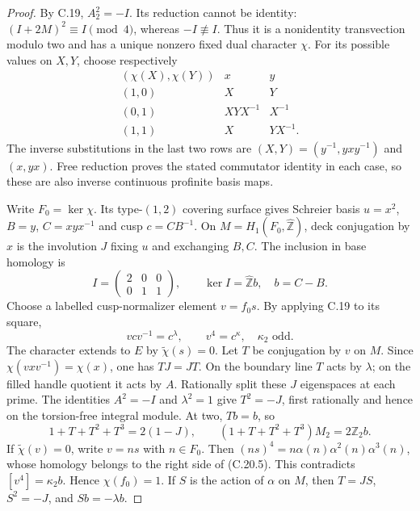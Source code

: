 \begin{proof}
By C.19, $A_2^2=-I$.  Its reduction cannot be identity:
$(I+2M)^2\equiv I\pmod4$, whereas $-I\not\equiv I$.
Thus it is a nonidentity transvection modulo two and
has a unique nonzero fixed dual character $\chi$.
For its possible values on $X,Y$, choose respectively
\[
\begin{array}{c|cc}
(\chi(X),\chi(Y))&x&y\\\hline
(1,0)&X&Y\\
(0,1)&XYX^{-1}&X^{-1}\\
(1,1)&X&YX^{-1}.
\end{array}
\]
The inverse substitutions in the last two rows are
$(X,Y)=(y^{-1},yxy^{-1})$ and $(x,yx)$.
Free reduction proves the stated commutator identity
in each case, so these are also inverse continuous
profinite basis maps.

Write $F_0=\ker\chi$.  Its type-$(1,2)$ covering
surface gives Schreier basis
$u=x^2$, $B=y$, $C=xyx^{-1}$ and cusp $c=CB^{-1}$.
On $M=H_1(F_0,\widehat{\mathbb Z})$, deck conjugation
by $x$ is the involution $J$ fixing $u$ and exchanging
$B,C$.  The inclusion in base homology is
\[
 I=\begin{pmatrix}2&0&0\\0&1&1\end{pmatrix},
 \qquad\ker I=\widehat{\mathbb Z}b,\quad b=C-B.
                                                               \tag{C.20.3}
\]
Choose a labelled cusp-normalizer element $v=f_0s$.
By applying C.19 to its square,
\[
 vcv^{-1}=c^\lambda,\qquad v^4=c^\kappa,
                           \quad\kappa_2\text{ odd}.        \tag{C.20.4}
\]
The character extends to $E$ by $\widetilde\chi(s)=0$.
Let $T$ be conjugation by $v$ on $M$.  Since
$\chi(vxv^{-1})=\chi(x)$, one has $TJ=JT$.
On the boundary line $T$ acts by $\lambda$; on
the filled handle quotient it acts by $A$.
Rationally split these $J$ eigenspaces at each prime.
The identities $A^2=-I$ and $\lambda^2=1$ give
$T^2=-J$, first rationally and hence on the torsion-free
integral module.  At two, $Tb=b$, so
\[
 1+T+T^2+T^3=2(1-J),\qquad
 (1+T+T^2+T^3)M_2=2\mathbb Z_2b.                           \tag{C.20.5}
\]
If $\widetilde\chi(v)=0$, write $v=ns$ with $n\in F_0$.
Then $(ns)^4=n\alpha(n)\alpha^2(n)\alpha^3(n)$,
whose homology belongs to the right side of (C.20.5).
This contradicts $[v^4]=\kappa_2b$.  Hence
$\chi(f_0)=1$.  If $S$ is the action of $\alpha$ on
$M$, then $T=JS$, $S^2=-J$, and $Sb=-\lambda b$.


\end{proof}
